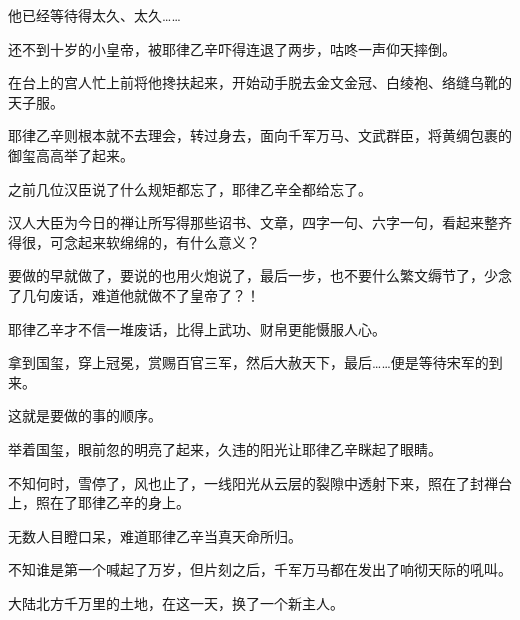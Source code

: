 他已经等待得太久、太久……

还不到十岁的小皇帝，被耶律乙辛吓得连退了两步，咕咚一声仰天摔倒。

在台上的宫人忙上前将他搀扶起来，开始动手脱去金文金冠、白绫袍、络缝乌靴的天子服。

耶律乙辛则根本就不去理会，转过身去，面向千军万马、文武群臣，将黄绸包裹的御玺高高举了起来。

之前几位汉臣说了什么规矩都忘了，耶律乙辛全都给忘了。

汉人大臣为今日的禅让所写得那些诏书、文章，四字一句、六字一句，看起来整齐得很，可念起来软绵绵的，有什么意义？

要做的早就做了，要说的也用火炮说了，最后一步，也不要什么繁文缛节了，少念了几句废话，难道他就做不了皇帝了？！

耶律乙辛才不信一堆废话，比得上武功、财帛更能慑服人心。

拿到国玺，穿上冠冕，赏赐百官三军，然后大赦天下，最后……便是等待宋军的到来。

这就是要做的事的顺序。

举着国玺，眼前忽的明亮了起来，久违的阳光让耶律乙辛眯起了眼睛。

不知何时，雪停了，风也止了，一线阳光从云层的裂隙中透射下来，照在了封禅台上，照在了耶律乙辛的身上。

无数人目瞪口呆，难道耶律乙辛当真天命所归。

不知谁是第一个喊起了万岁，但片刻之后，千军万马都在发出了响彻天际的吼叫。

大陆北方千万里的土地，在这一天，换了一个新主人。
